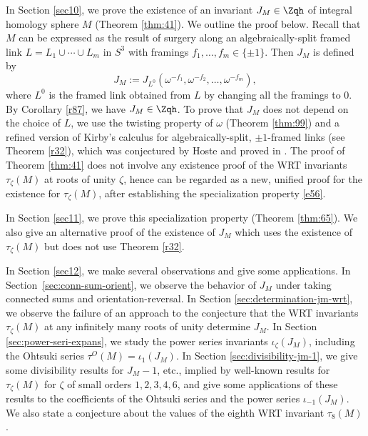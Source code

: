 \documentclass{amsart}
\numberwithin{equation}{section}
\numberwithin{figure}{section}
\theoremstyle{plain}
\theoremstyle{definition}
\theoremstyle{remark}
\begin{document}
In Section \ref{sec10}, we prove the existence of an invariant
$J_M\in \Zqh$ of integral homology sphere $M$ (Theorem \ref{thm:41}).
We outline the proof below.  Recall that $M$ can be expressed as the
result of surgery along an algebraically-split framed link
$L=L_1\cup \cdots\cup L_m$ in $S^3$ with framings $f_1,\ldots,f_m\in \{\pm 1\}$.  Then
$J_M$ is defined by
\begin{equation*}
  J_M:= J_{L^0}(\omega ^{-f_1},\omega ^{-f_2},\ldots,\omega ^{-f_m}),
\end{equation*}
where $L^0$ is the framed link obtained from $L$ by changing all the
framings to $0$.  By Corollary \ref{r87}, we have $J_M\in \Zqh$.  To
prove that $J_M$ does not depend on the choice of $L$, we use the
twisting property of $\omega $ (Theorem \ref{thm:99}) and a refined version
of Kirby's calculus for algebraically-split, $\pm 1$-framed links (see
Theorem \ref{r32}), which was conjectured by Hoste \cite{Hoste} and
proved in \cite{H:kirby1}.  The proof of Theorem \ref{thm:41} does not
involve any existence proof of the WRT
invariants $\tau _\zeta (M)$ at roots of unity $\zeta $, hence can be regarded as
a new, unified proof for the existence for $\tau _\zeta (M)$, after
establishing the specialization property \eqref{e56}.

In Section \ref{sec11}, we prove this specialization property (Theorem
 \ref{thm:65}).  We also give an alternative proof of the existence of
 $J_M$ which uses the existence of $\tau _\zeta (M)$ but does not use Theorem
 \ref{r32}.

In Section \ref{sec12}, we make several observations and give some
applications.  In Section~\ref{sec:conn-sum-orient}, we observe the
behavior of $J_M$ under taking connected sums and
orientation-reversal.  In Section \ref{sec:determination-jm-wrt}, we
observe the failure of an approach to the conjecture that the
WRT invariants $\tau _\zeta (M)$ at any infinitely many
roots of unity determine $J_M$.  In Section
\ref{sec:power-seri-expans}, we study the power series invariants
$\iota _\zeta (J_M)$, including the Ohtsuki series $\tau ^O(M)=\iota _1(J_M)$.  In
Section \ref{sec:divisibility-jm-1}, we give some divisibility results
for $J_M-1$, etc., implied by well-known results for $\tau _\zeta (M)$ for
$\zeta $ of small orders $1,2,3,4,6$, and give some applications of these
results to the coefficients of the Ohtsuki series and the power series
$\iota _{-1}(J_M)$.  We also state a conjecture about the values of the
eighth WRT invariant $\tau _8(M)$.
\end{document}
